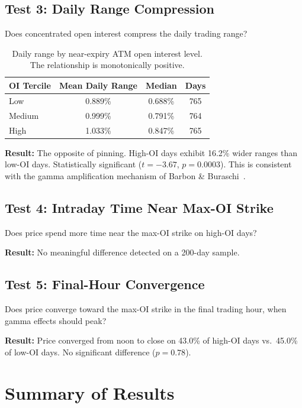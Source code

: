 \documentclass[11pt]{article}
\begin{document}
\subsection{Test 3: Daily Range Compression}

Does concentrated open interest compress the daily trading range?

\begin{table}[h]
\centering
\begin{tabular}{lccc}
\toprule
OI Tercile & Mean Daily Range & Median & Days \\
\midrule
Low & 0.889\% & 0.688\% & 765 \\
Medium & 0.999\% & 0.791\% & 764 \\
High & 1.033\% & 0.847\% & 765 \\
\bottomrule
\end{tabular}
\caption{Daily range by near-expiry ATM open interest level. The relationship is monotonically positive.}
\label{tab:range}
\end{table}

\textbf{Result:} The opposite of pinning. High-OI days exhibit 16.2\% wider ranges than low-OI days. Statistically significant ($t = -3.67$, $p = 0.0003$). This is consistent with the gamma amplification mechanism of Barbon \& Buraschi~\cite{barbon2021}.

\subsection{Test 4: Intraday Time Near Max-OI Strike}

Does price spend more time near the max-OI strike on high-OI days?

\textbf{Result:} No meaningful difference detected on a 200-day sample.

\subsection{Test 5: Final-Hour Convergence}

Does price converge toward the max-OI strike in the final trading hour, when gamma effects should peak?

\textbf{Result:} Price converged from noon to close on 43.0\% of high-OI days vs.\ 45.0\% of low-OI days. No significant difference ($p = 0.78$).

\section{Summary of Results}
\end{document}
